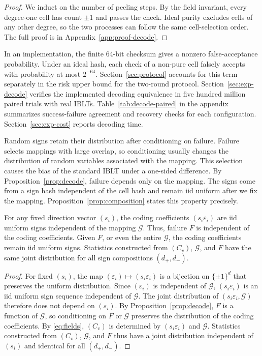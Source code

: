 \begin{proof}
We induct on the number of peeling steps. By the field invariant, every degree-one cell has count $\pm1$ and passes the check. Ideal purity excludes cells of any other degree, so the two processes can follow the same cell-selection order. The full proof is in Appendix~\ref{app:proof-decode}.
\end{proof}

In an implementation, the finite 64-bit checksum gives a nonzero false-acceptance probability. Under an ideal hash, each check of a non-pure cell falsely accepts with probability at most $2^{-64}$. Section~\ref{sec:protocol} accounts for this term separately in the risk upper bound for the two-round protocol. Section~\ref{sec:exp-decode} verifies the implemented decoding equivalence in five hundred million paired trials with real IBLTs. Table~\ref{tab:decode-paired} in the appendix summarizes success-failure agreement and recovery checks for each configuration. Section~\ref{sec:exp-cost} reports decoding time.

Random signs retain their distribution after conditioning on failure. Failure selects mappings with large overlap, so conditioning usually changes the distribution of random variables associated with the mapping. This selection causes the bias of the standard IBLT under a one-sided difference. By Proposition~\ref{prop:decode}, failure depends only on the mapping. The signs come from a sign hash independent of the cell hash and remain iid uniform after we fix the mapping. Proposition~\ref{prop:composition} states this property precisely.

\begin{proposition}\label{prop:composition}
For any fixed direction vector $(s_i)$, the coding coefficients $(s_i\varepsilon_i)$ are iid uniform signs independent of the mapping $\mathcal G$. Thus, failure $F$ is independent of the coding coefficients. Given $F$, or even the entire $\mathcal G$, the coding coefficients remain iid uniform signs. Statistics constructed from $(C_v)$, $\mathcal G$, and $F$ have the same joint distribution for all sign compositions $(d_+,d_-)$.
\end{proposition}

\begin{proof}
For fixed $(s_i)$, the map $(\varepsilon_i)\mapsto(s_i\varepsilon_i)$ is a bijection on $\{\pm1\}^d$ that preserves the uniform distribution. Since $(\varepsilon_i)$ is independent of $\mathcal G$, $(s_i\varepsilon_i)$ is an iid uniform sign sequence independent of $\mathcal G$. The joint distribution of $(s_i\varepsilon_i,\mathcal G)$ therefore does not depend on $(s_i)$. By Proposition~\ref{prop:decode}, $F$ is a function of $\mathcal G$, so conditioning on $F$ or $\mathcal G$ preserves the distribution of the coding coefficients. By \eqref{eq:fields}, $(C_v)$ is determined by $(s_i\varepsilon_i)$ and $\mathcal G$. Statistics constructed from $(C_v)$, $\mathcal G$, and $F$ thus have a joint distribution independent of $(s_i)$ and identical for all $(d_+,d_-)$.
\end{proof}

